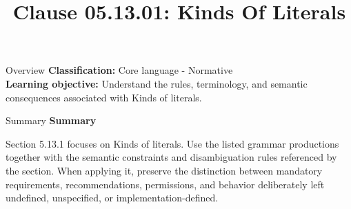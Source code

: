 \documentclass[10pt,letterpaper]{article}
\title{Clause 05.13.01: Kinds Of Literals}
\author{}
\date{}
\begin{document}
\maketitle
\begin{CornellOverviewBox}{Overview}
\textbf{Classification:} Core language - Normative\\[2pt]
\textbf{Learning objective:} Understand the rules, terminology, and semantic consequences associated with Kinds of literals.
\end{CornellOverviewBox}\begin{CornellSummaryBox}{Summary}
{\sffamily\bfseries\color{Accent} Summary}\par\vspace{3pt}Section 5.13.1 focuses on Kinds of literals. Use the listed grammar productions together with the semantic constraints and disambiguation rules referenced by the section. When applying it, preserve the distinction between mandatory requirements, recommendations, permissions, and behavior deliberately left undefined, unspecified, or implementation-defined.
\end{CornellSummaryBox}
\end{document}
